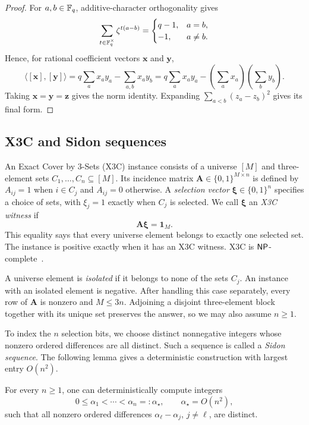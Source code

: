 \begin{proof}
For $a,b\in\mathbb F_q$, additive-character orthogonality gives
\[
 \sum_{t\in\mathbb F_q^\times}\zeta^{t(a-b)}
 =\begin{cases}
   q-1,&a=b,\\
   -1,&a\ne b.
  \end{cases}
\]
Hence, for rational coefficient vectors $\mathbf x$ and $\mathbf y$,
\[
 \langle[\mathbf x],[\mathbf y]\rangle
 =q\sum_a x_ay_a-\sum_{a,b}x_ay_b
 =q\sum_a x_ay_a-\left(\sum_a x_a\right)\left(\sum_b y_b\right).
\]
Taking $\mathbf x=\mathbf y=\mathbf z$ gives the norm identity.  Expanding
$\sum_{a<b}(z_a-z_b)^2$ gives its final form.
\end{proof}

\subsection{X3C and Sidon sequences}

An Exact Cover by 3-Sets (X3C) instance consists of a universe
$[M]$ and three-element sets $C_1,\ldots,C_n\subseteq[M]$.  Its incidence
matrix $\mathbf A\in\{0,1\}^{M\times n}$ is defined by $A_{ij}=1$ when
$i\in C_j$ and $A_{ij}=0$ otherwise.  A \emph{selection vector}
$\boldsymbol\xi\in\{0,1\}^n$ specifies a choice of sets, with $\xi_j=1$
exactly when $C_j$ is selected.  We call $\boldsymbol\xi$ an
\emph{X3C witness} if
\[
 \mathbf A\boldsymbol\xi=\mathbf1_M.
\]
This equality says that every universe element belongs to exactly one
selected set.  The instance is positive exactly when it has an X3C witness.
X3C is $\mathsf{NP}$-complete~\cite{GareyJohnson79}.

A universe element is \emph{isolated} if it belongs to none of the sets $C_j$.  An instance with an isolated element is negative.  After handling
this case separately, every row of $\mathbf A$ is nonzero and $M\le3n$.
Adjoining a disjoint three-element block together with its unique set
preserves the answer, so we may also assume $n\ge1$.

To index the $n$ selection bits, we choose distinct nonnegative
integers whose nonzero ordered differences are all distinct.  Such a sequence
is called a \emph{Sidon sequence}.  The following lemma gives a
deterministic construction with largest entry $O(n^2)$.
\begin{lemma}
\label{lem:sidon}
For every $n\ge1$, one can deterministically compute integers
\[
 0\le\alpha_1<\cdots<\alpha_n=: \alpha_\star,
 \qquad \alpha_\star=O(n^2),
\]
such that all nonzero ordered differences
$\alpha_\ell-\alpha_j$, $j\ne\ell$, are distinct.
\end{lemma}

